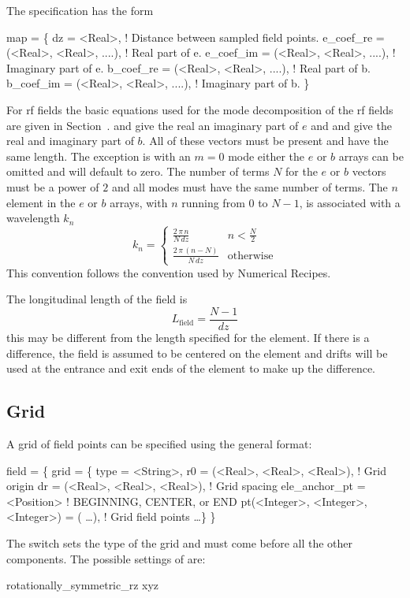 The  specification has the form
\begin{example}
  map = \{
    dz        = <Real>,    ! Distance between sampled field points.
    e_coef_re = (<Real>, <Real>, ....),  ! Real part of e.
    e_coef_im = (<Real>, <Real>, ....),  ! Imaginary part of e.
    b_coef_re = (<Real>, <Real>, ....),  ! Real part of b.
    b_coef_im = (<Real>, <Real>, ....),  ! Imaginary part of b.
  \}
\end{example}
For rf fields the basic equations used for the mode decomposition of
the rf fields are given in Section~. 
 and  give the real an imaginary part of $e$ and
 and  give the real and imaginary part of $b$. All
of these vectors must be present and have the same length. The
exception is with an $m = 0$ mode either the $e$ or $b$ arrays can be
omitted and will default to zero. The number of terms $N$ for the $e$
or $b$ vectors must be a power of $2$ and all modes must have the same
number of terms. The $n$\Th element in the $e$ or $b$ arrays, with $n$
running from 0 to $N-1$, is associated with a wavelength $k_n$
\begin{equation}
  k_n = \begin{cases}
    \frac{2 \, \pi \, n}{N \, dz} & n < \frac{N}{2} \\
    \frac{2 \, \pi \, (n-N)}{N \, dz} & \text{otherwise}
  \end{cases}
\end{equation}
This convention follows the convention used by Numerical
Recipes\cite{b:nr}.  

 The longitudinal length
of the field is
\begin{equation}
  L_{\text{field}} = \frac{N - 1}{dz}
\end{equation}
this may be different from the length  specified for the
element. If there is a difference, the field is assumed to be centered
on the element and drifts will be used at the entrance and exit ends
of the element to make up the difference.

\subsection {Grid}
\label{ss:grid}

A grid of field points can be specified using the general format:
\begin{example}
  field = \{
    grid = \{ 
      type = <String>,
      r0   = (<Real>, <Real>, <Real>),  ! Grid origin 
      dr   = (<Real>, <Real>, <Real>),  ! Grid spacing
      ele_anchor_pt = <Position>        ! BEGINNING, CENTER, or END
      pt(<Integer>, <Integer>, <Integer>) = ( \ldots ),  ! Grid field points
      \ldots \} \}
\end{example}
The  switch sets the type of the grid and must come before
all the other components. The possible settings of  are:
\begin{example} 
  rotationally_symmetric_rz
  xyz
\end{example}

